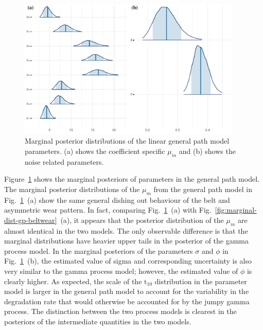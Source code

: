 \begin{figure}[tbp]
  \centering
  \includegraphics[width=0.95\textwidth]{figures/ch-6/marginal_post_lm.pdf}
  \caption{Marginal posterior distributions of the linear general path model parameters. (a) shows the coefficient specific $\mu_m$ and (b) shows the noise related parameters.}
  \label{fig:marginal-dist-lm-beltwear}
\end{figure}

Figure~\ref{fig:marginal-dist-lm-beltwear} shows the marginal posteriors of parameters in the general path model. The marginal posterior distributions of the $\mu_m$ from the general path model in Fig.~\ref{fig:marginal-dist-lm-beltwear}~(a) show the same general dishing out behaviour of the belt and asymmetric wear pattern. In fact, comparing Fig.~\ref{fig:marginal-dist-lm-beltwear}~(a) with Fig.~\ref{fig:marginal-dist-gp-beltwear}~(a), it appears that the posterior distribution of the $\mu_m$ are almost identical in the two models. The only observable difference is that the marginal distributions have heavier upper tails in the posterior of the gamma process model. In the marginal posteriors of the parameters $\sigma$ and $\phi$ in Fig.~\ref{fig:marginal-dist-lm-beltwear}~(b), the estimated value of sigma and corresponding uncertainty is also very similar to the gamma process model; however, the estimated value of $\phi$ is clearly higher. As expected, the scale of the $\mbox{t}_{10}$ distribution in the parameter model is larger in the general path model to account for the variability in the degradation rate that would otherwise be accounted for by the jumpy gamma process. The distinction between the two process models is clearest in the posteriors of the intermediate quantities in the two models.

